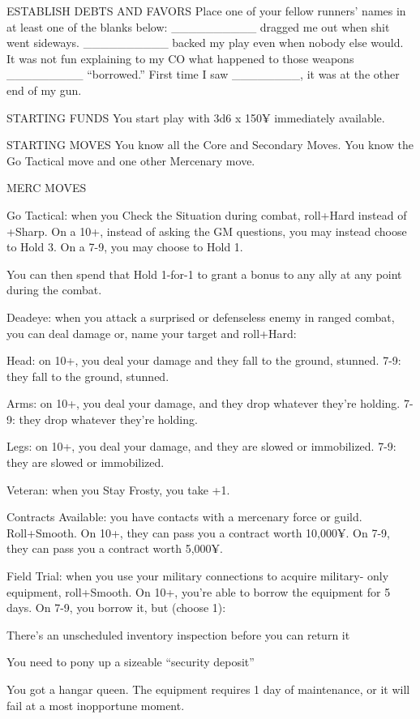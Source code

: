 ESTABLISH DEBTS AND FAVORS
Place one of your fellow runners’ names in at least one of the blanks below:
\_\_\_\_\_\_\_\_\_\_ dragged me out when shit went sideways.
\_\_\_\_\_\_\_\_\_\_ backed my play even when nobody else would.
It was not fun explaining to my CO what happened to those weapons \_\_\_\_\_\_\_\_\_ “borrowed.”
First time I saw \_\_\_\_\_\_\_\_, it was at the other end of my gun.

STARTING FUNDS
You start play with 3d6 x 150¥ immediately available.

STARTING MOVES
You know all the Core and Secondary Moves. You know the Go Tactical move and one other Mercenary move.

MERC MOVES

Go Tactical: when you Check the Situation during combat, roll+Hard instead of +Sharp. On a 10+, instead of asking the GM questions, you may instead choose to Hold 3. On a 7-9, you may choose to Hold 1.

You can then spend that Hold 1-for-1 to grant a bonus to any ally at any point during the combat.

Deadeye: when you attack a surprised or defenseless enemy in ranged combat, you can deal damage or, name your target and roll+Hard:

Head: on 10+, you deal your damage and they fall to the ground, stunned. 7-9: they fall to the ground, stunned.

Arms: on 10+, you deal your damage, and they drop whatever they’re holding. 7-9: they drop whatever they’re holding.

Legs: on 10+, you deal your damage, and they are slowed or immobilized. 7-9: they are slowed or immobilized.

Veteran: when you Stay Frosty, you take +1.

Contracts Available: you have contacts with a mercenary force or guild. Roll+Smooth. On 10+, they can pass you a contract worth 10,000¥. On 7-9, they can pass you a contract worth 5,000¥.

Field Trial: when you use your military connections to acquire military- only equipment, roll+Smooth. On 10+, you’re able to borrow the equipment for 5 days. On 7-9, you borrow it, but (choose 1):

There’s an unscheduled inventory inspection before you can return it

You need to pony up a sizeable “security deposit”

You got a hangar queen. The equipment requires 1 day of maintenance, or it will fail at a most inopportune moment.

